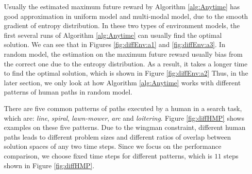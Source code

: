 Usually the estimated maximum future reward by Algorithm \ref{alg:Anytime} has good approximation in uniform model and multi-modal model, due to the smooth gradient of entropy distribution. 
In these two types of environment models, the first several runs of Algorithm \ref{alg:Anytime} can usually find the optimal solution.
We can see that in Figures \ref{fig:diffEnv:a1} and \ref{fig:diffEnv:a3}.
In random model, the estimation on the maximum future reward usually bias from the correct one due to the entropy distribution.
As a result, it takes a longer time to find the optimal solution, which is shown in Figure \ref{fig:diffEnv:a2}
Thus, in the later section, we only look at how Algorithm \ref{alg:Anytime} works with different patterns of human paths in random model.

There are five common patterns of paths executed by a human in a search task, which are:
\emph{line}, \emph{spiral}, \emph{lawn-mower}, \emph{arc} and \emph{loitering}.
Figure \ref{fig:diffHMP} shows examples on these five patterns.
Due to the wingman constraint, different human paths leads to different problem sizes and different ratios of overlap between solution spaces of any two time steps.
Since we focus on the performance comparison, we choose fixed time steps for different patterns, which is $ 11 $ steps shown in Figure \ref{fig:diffHMP}. 

